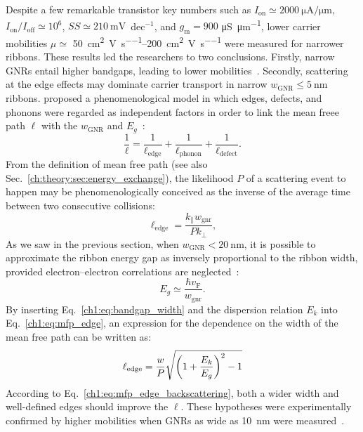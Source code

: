 Despite a few remarkable transistor key numbers such as $I_\textrm{on}\simeq\SI{2000}{\micro\ampere\per\micro\metre}$, $I_\textrm{on}/I_\textrm{off}\simeq 10^6$, $SS\simeq\SI{210}{\milli\volt}$~dec$^{-1}$, and $g_\textrm{m} = 900$ \si{\micro\siemens\per\micro\metre}, lower carrier mobilities $\mu\simeq$ \SIrange{50}{200}{\centi\metre\squared\per\volt\per\second} were measured for narrower ribbons. These results led the researchers to two conclusions. Firstly, narrow \glspl{GNR} entail higher bandgaps, leading to lower mobilities~\cite{peter2010fundamentals}. Secondly, scattering at the edge effects may dominate carrier transport in narrow $w_\textrm{GNR}\le\SI{5}{\nano\metre}$ ribbons.  proposed a phenomenological model in which edges, defects, and phonons were regarded as independent factors in order to link the mean freee path $\ell$ with the $w_\textrm{GNR}$ and $E_g$~\cite{wang2008room}:
%
\begin{equation}
    \frac{1}{\ell} = \frac{1}{\ell_\textrm{edge}} + \frac{1}{\ell_\textrm{phonon}} + \frac{1}{\ell_\textrm{defect}}.
\end{equation}
%
From the definition of mean free path (see also Sec.~\ref{ch:theory:sec:energy_exchange}), the likelihood $P$ of a scattering event to happen may be phenomenologically conceived as the inverse of the average time between two consecutive collisions:
%
\begin{equation}\label{ch1:eq:mfp_edge}
    \ell_\textrm{edge} = \frac{k_\parallel w_\textrm{gnr}}{P k_\perp},
\end{equation}
%
As we saw in the previous section, when $w_\textrm{GNR}<\SI{20}{\nano\metre}$, it is possible to approximate the ribbon energy gap as inversely proportional to the ribbon width, provided electron--electron correlations are neglected~\cite{stampfer2008tunable}:
%
\begin{equation}\label{ch1:eq:bandgap_width}
    E_g\simeq\frac{\hbar v_\textrm{F}}{w_\textrm{gnr}}.
\end{equation}
%
By inserting Eq.~\ref{ch1:eq:bandgap_width} and the dispersion relation $E_k$ into Eq.~\ref{ch1:eq:mfp_edge}, an expression for the dependence on the width of the mean free path can be written as:
%
\begin{equation}\label{ch1:eq:mfp_edge_backscattering}
    \ell_\textrm{edge} = \frac{w}{P}\sqrt{\qty(1 + \frac{E_k}{E_g})^2 - 1}
\end{equation}
%
According to Eq.~\ref{ch1:eq:mfp_edge_backscattering}, both a wider width and well-defined edges should improve the $\ell$. These hypotheses were experimentally confirmed by higher mobilities when \glspl{GNR} as wide as \SI{10}{\nano\metre} were measured~\cite{wang2008room, geng2017graphene}.

